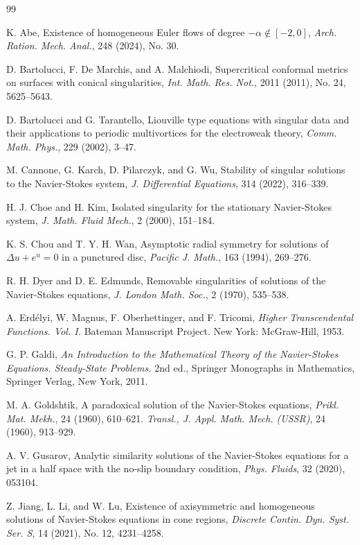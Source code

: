 \documentclass[12pt]{article}
\begin{document}
\begin{thebibliography}{99}

 K. Abe, Existence of homogeneous Euler flows of degree $-\alpha \notin [-2, 0]$, \emph{Arch. Ration. Mech. Anal.}, 248 (2024), No. 30.

 D. Bartolucci, F. De Marchis, and A. Malchiodi, Supercritical conformal metrics on surfaces with conical singularities, \emph{Int. Math. Res. Not.}, 2011 (2011), No. 24, 5625--5643.

 D. Bartolucci and G. Tarantello, Liouville type equations with singular data and their applications to periodic multivortices for the electroweak theory, \emph{Comm. Math. Phys.}, 229 (2002), 3--47.

 M. Cannone, G. Karch, D. Pilarczyk, and G. Wu, Stability of singular solutions to the Navier-Stokes system, \emph{J. Differential Equations}, 314 (2022), 316--339.

 H. J. Choe and H. Kim, Isolated singularity for the stationary Navier-Stokes system, \emph{J. Math. Fluid Mech.}, 2 (2000), 151--184.

 K. S. Chou and T. Y. H. Wan, Asymptotic radial symmetry for solutions of $\Delta u + e^u = 0$ in a punctured disc, \emph{Pacific J. Math.}, 163 (1994), 269--276.

 R. H. Dyer and D. E. Edmunds, Removable singularities of solutions of the Navier-Stokes equations, \emph{J. London Math. Soc.}, 2 (1970), 535--538.

 A. Erd\'elyi, W. Magnus, F. Oberhettinger, and F. Tricomi, \emph{Higher Transcendental Functions. Vol. I.} Bateman Manuscript Project. New York: McGraw-Hill, 1953.

 G. P. Galdi, \emph{An Introduction to the Mathematical Theory of the Navier-Stokes Equations. Steady-State Problems.} 2nd ed., Springer Monographs in Mathematics, Springer Verlag, New York, 2011.

 M. A. Goldshtik, A paradoxical solution of the Navier-Stokes equations, \emph{Prikl. Mat. Mekh.}, 24 (1960), 610--621. \emph{Transl., J. Appl. Math. Mech. (USSR)}, 24 (1960), 913--929.

 A. V. Gusarov, Analytic similarity solutions of the Navier-Stokes equations for a jet in a half space with the no-slip boundary condition, \emph{Phys. Fluids}, 32 (2020), 053104.

 Z. Jiang, L. Li, and W. Lu, Existence of axisymmetric and homogeneous solutions of Navier-Stokes equations in cone regions, \emph{Discrete Contin. Dyn. Syst. Ser. S}, 14 (2021), No. 12, 4231--4258.


\end{thebibliography}
\end{document}
